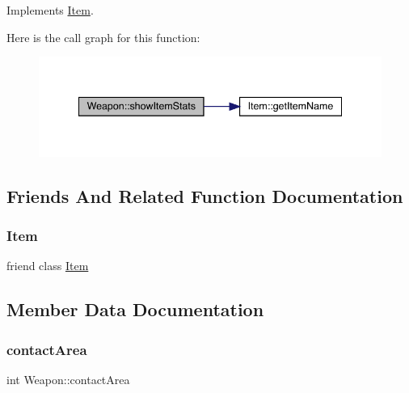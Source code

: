 Implements \mbox{\hyperlink{class_item_aaf7dae41afdce432c11261043e8e4e30}{Item}}.

Here is the call graph for this function\+:
\nopagebreak
\begin{figure}[H]
\begin{center}
\leavevmode
\includegraphics[width=341pt]{class_weapon_a5bd0118be0d84307c0865a63d907fec7_cgraph}
\end{center}
\end{figure}


\subsection{Friends And Related Function Documentation}
\mbox{\label{class_weapon_aad85754f188b769ff61150eaf36106c4}} 
\subsubsection{\texorpdfstring{Item}{Item}}
{\footnotesize\ttfamily friend class \mbox{\hyperlink{class_item}{Item}}\hspace{0.3cm}{\ttfamily [friend]}}



\subsection{Member Data Documentation}
\mbox{\label{class_weapon_a7bdfc4c90d872b07d6dc78d9d0f4e662}} 
\subsubsection{\texorpdfstring{contact\+Area}{contactArea}}
{\footnotesize\ttfamily int Weapon\+::contact\+Area\hspace{0.3cm}{\ttfamily [private]}}

\mbox{\label{class_weapon_a24ad6d1a7d69604fc35d5c7f65245df4}} 
